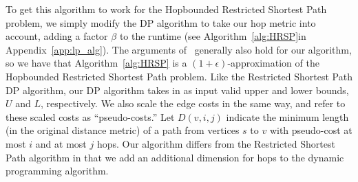 \documentclass{article}
\theoremstyle{definition}
\theoremstyle{remark}
\newcommand{\quotes}[1]{``#1''}
\begin{document}
To get this algorithm to work for the Hopbounded Restricted Shortest Path problem, we simply modify the DP algorithm to take our hop metric into account, adding a factor $\beta$ to the runtime (see Algorithm~\ref{alg:HRSP}\iflong\else in Appendix~\ref{app:lp_alg}\fi). \iflong \else The arguments of~\cite{LR01} generally also hold for our algorithm, so we have that Algorithm~\ref{alg:HRSP} is a $(1+\epsilon)$-approximation of the Hopbounded Restricted Shortest Path problem. \fi
\iflong
Like the Restricted Shortest Path DP algorithm, our DP algorithm takes in as input valid upper and lower bounds, $U$ and $L$, respectively. We also scale the edge costs in the same way, and refer to these scaled costs as \quotes{pseudo-costs.} Let $D(v, i, j)$ indicate the minimum length (in the original distance metric) of a path from vertices $s$ to $v$ with pseudo-cost at most $i$ and at most $j$ hops. Our algorithm differs from the Restricted Shortest Path algorithm in that we add an additional dimension for hops to the dynamic programming algorithm.
\end{document}
